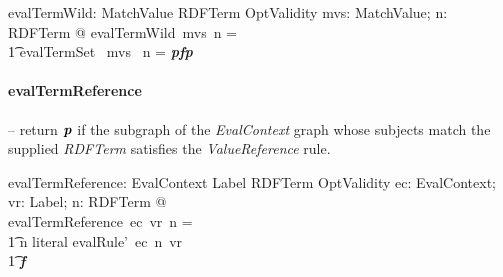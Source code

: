 \documentclass[fuzz]{llncs}
\def\pass{\textbf{\textit{p}}}
\def\fail{\textbf{\textit{f}}}
\def\zc{\textit}
\begin{document}
\begin{gendef}
   evalTermWild: \power MatchValue \fun RDFTerm \fun OptValidity
\where
   \forall mvs: \power MatchValue; n: RDFTerm @ evalTermWild~mvs~n = \\
\t1 \IF evalTermSet~ mvs~ n = \pass \THEN \fail \ELSE \pass
\end{gendef}

\paragraph{evalTermReference} -- return $\pass$ if the subgraph of the \zc{EvalContext} graph whose subjects match the supplied \zc{RDFTerm} satisfies the \zc{ValueReference} rule.

\begin{gendef}
   evalTermReference: EvalContext \pfun Label \pfun RDFTerm \pfun OptValidity
\where
	\forall ec: EvalContext; vr: Label; n: RDFTerm @ \\ evalTermReference~ec~vr~n = \\
\t1 \IF n \notin \ran literal \THEN evalRule'~ec~n~vr \\
\t1 \ELSE \fail
\end{gendef}
\end{document}
